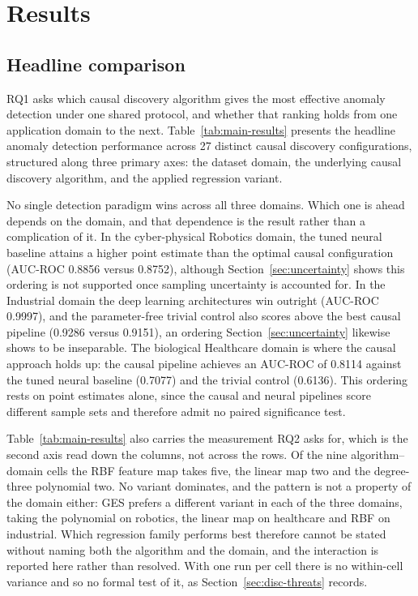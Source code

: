 \chapter{Results}
\label{ch:results}

\section{Headline comparison}

RQ1 asks which causal discovery algorithm gives the most effective anomaly detection under one shared protocol, and whether that ranking holds from one application domain to the next. Table~\ref{tab:main-results} presents the headline anomaly detection performance across 27 distinct causal discovery configurations, structured along three primary axes: the dataset domain, the underlying causal discovery algorithm, and the applied regression variant.


No single detection paradigm wins across all three domains. Which one is ahead depends on the domain, and that dependence is the result rather than a complication of it. In the cyber-physical Robotics domain, the tuned neural baseline attains a higher point estimate than the optimal causal configuration (AUC-ROC 0.8856 versus 0.8752), although Section~\ref{sec:uncertainty} shows this ordering is not supported once sampling uncertainty is accounted for. In the Industrial domain the deep learning architectures win outright (AUC-ROC 0.9997), and the parameter-free trivial control also scores above the best causal pipeline (0.9286 versus 0.9151), an ordering Section~\ref{sec:uncertainty} likewise shows to be inseparable. The biological Healthcare domain is where the causal approach holds up: the causal pipeline achieves an AUC-ROC of 0.8114 against the tuned neural baseline (0.7077) and the trivial control (0.6136). This ordering rests on point estimates alone, since the causal and neural pipelines score different sample sets and therefore admit no paired significance test.

Table~\ref{tab:main-results} also carries the measurement RQ2 asks for, which is the second axis read down the columns, not across the rows. Of the nine algorithm--domain cells the RBF feature map takes five, the linear map two and the degree-three polynomial two. No variant dominates, and the pattern is not a property of the domain either: GES prefers a different variant in each of the three domains, taking the polynomial on robotics, the linear map on healthcare and RBF on industrial. Which regression family performs best therefore cannot be stated without naming both the algorithm and the domain, and the interaction is reported here rather than resolved. With one run per cell there is no within-cell variance and so no formal test of it, as Section~\ref{sec:disc-threats} records.


